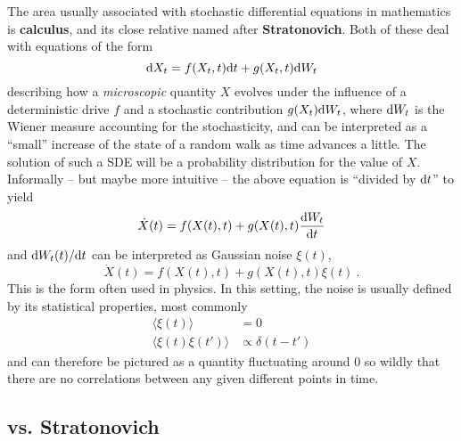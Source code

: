 The area usually associated with stochastic differential equations in mathematics is \textbf{\Ito{} calculus}, and its close relative named after \textbf{Stratonovich}. Both of these deal with equations of the form
%
\begin{equation}
	\label{eqn:sde}
	\mathrm{d} X_t = f(X_t,t) \mathrm{d} t + g(X_t,t) \mathrm{d} W_t
\end{equation}
%
describing how a \emph{microscopic} quantity \(X\) evolves under the influence of a deterministic drive \(f\) and a stochastic contribution \(g(X_t)\mathrm{d} W_t\), where \(\mathrm{d} W_t\) is the Wiener measure accounting for the stochasticity, and can be interpreted as a ``small'' increase of the state of a random walk as time advances a little. The solution of such a SDE will be a probability distribution for the value of \(X\).
Informally -- but maybe more intuitive -- the above equation is ``divided by \(\mathrm{d} t\)'' to yield
%
\begin{equation}
	\dot X(t) = f(X(t),t) + g(X(t),t)\frac{\mathrm{d} W_t}{\mathrm{d} t}
\end{equation}
%
and \(\mathrm{d} W_t(t)/\mathrm{d} t\) can be interpreted as Gaussian noise \(\xi(t)\),
\begin{equation}
	\dot X(t) = f(X(t),t) + g(X(t),t)\xi(t)~.
\end{equation}
%
This is the form often used in physics. In this setting, the noise is usually defined by its statistical properties, most commonly
\begin{align}
	\langle\xi(t)\rangle &= 0 \\
	\langle\xi(t)\xi(t')\rangle &\propto \delta(t-t')
\end{align}
%
and can therefore be pictured as a quantity fluctuating around \(0\) so wildly that there are no correlations between any given different points in time.



\subsection{\Ito{} vs. Stratonovich}

